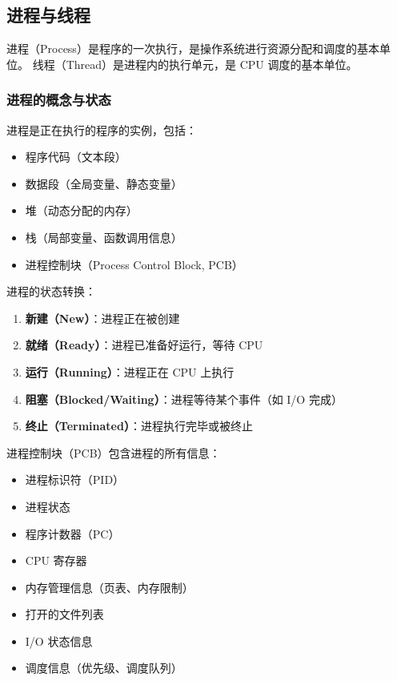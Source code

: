 \subsection{进程与线程}

进程（Process）是程序的一次执行，是操作系统进行资源分配和调度的基本单位。
线程（Thread）是进程内的执行单元，是 CPU 调度的基本单位。

\subsubsection{进程的概念与状态}


进程是正在执行的程序的实例，包括：
\begin{itemize}
  \item 程序代码（文本段）
  \item 数据段（全局变量、静态变量）
  \item 堆（动态分配的内存）
  \item 栈（局部变量、函数调用信息）
  \item 进程控制块（Process Control Block, PCB）
\end{itemize}

进程的状态转换：

\begin{enumerate}
  \item \textbf{新建（New）}：进程正在被创建
  \item \textbf{就绪（Ready）}：进程已准备好运行，等待 CPU
  \item \textbf{运行（Running）}：进程正在 CPU 上执行
  \item \textbf{阻塞（Blocked/Waiting）}：进程等待某个事件（如 I/O 完成）
  \item \textbf{终止（Terminated）}：进程执行完毕或被终止
\end{enumerate}

进程控制块（PCB）包含进程的所有信息：
\begin{itemize}
  \item 进程标识符（PID）
  \item 进程状态
  \item 程序计数器（PC）
  \item CPU 寄存器
  \item 内存管理信息（页表、内存限制）
  \item 打开的文件列表
  \item I/O 状态信息
  \item 调度信息（优先级、调度队列）
\end{itemize}

